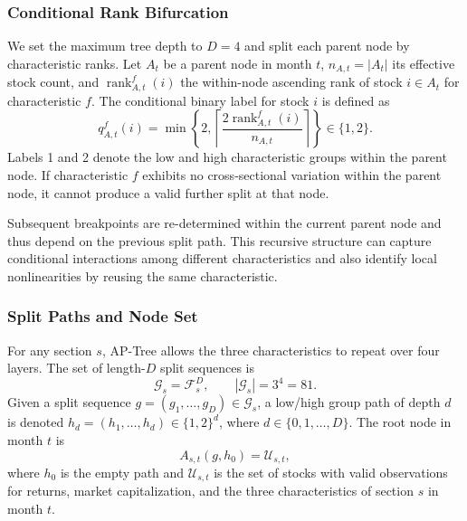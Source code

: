 \documentclass[12pt]{article}
\def\bm#1{#1}%
\def\top{}%
\begin{document}
\subsubsection{Conditional Rank Bifurcation}

We set the maximum tree depth to \(D=4\) and split each parent node by characteristic ranks. Let \(A_t\) be a parent node in month \(t\), \(n_{A,t}=|A_t|\) its effective stock count, and \(\operatorname{rank}_{A,t}^{f}(i)\) the within-node ascending rank of stock \(i\in A_t\) for characteristic \(f\). The conditional binary label for stock \(i\) is defined as
\begin{equation}
  q_{A,t}^{f}(i)
  =
  \min\left\{
    2,
    \left\lceil
      \frac{2\operatorname{rank}_{A,t}^{f}(i)}{n_{A,t}}
    \right\rceil
  \right\}
  \in\{1,2\}.
  \label{eq:conditional_ntile}
\end{equation}
Labels 1 and 2 denote the low and high characteristic groups within the parent node. If characteristic \(f\) exhibits no cross-sectional variation within the parent node, it cannot produce a valid further split at that node.

Subsequent breakpoints are re-determined within the current parent node and thus depend on the previous split path. This recursive structure can capture conditional interactions among different characteristics and also identify local nonlinearities by reusing the same characteristic.

\subsubsection{Split Paths and Node Set}

For any section \(s\), AP-Tree allows the three characteristics to repeat over four layers. The set of length-\(D\) split sequences is
\begin{equation}
  \mathcal G_s
  =
  \mathcal F_s^{D},
  \qquad
  |\mathcal G_s|=3^4=81.
  \label{eq:split_sequences}
\end{equation}
Given a split sequence
\(\bm g=(g_1,\ldots,g_D)^{\top}\in\mathcal G_s\), a low/high group path of depth \(d\) is denoted
\(\bm h_d=(h_1,\ldots,h_d)^{\top}\in\{1,2\}^{d}\), where
\(d\in\{0,1,\ldots,D\}\). The root node in month \(t\) is
\begin{equation}
  A_{s,t}(\bm g,\bm h_0)
  =\mathcal U_{s,t},
  \label{eq:root_node}
\end{equation}
where \(\bm h_0\) is the empty path and \(\mathcal U_{s,t}\) is the set of stocks with valid observations for returns, market capitalization, and the three characteristics of section \(s\) in month \(t\).
\end{document}
